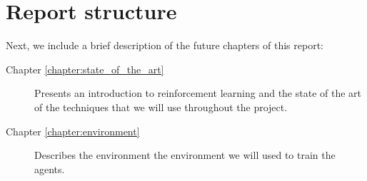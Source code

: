\section{Report structure}

Next, we include a brief description of the future chapters of this report:

\begin{description}
    \item[Chapter \ref{chapter:state_of_the_art}] Presents an introduction to reinforcement learning and the state of the art of the techniques that we will use throughout the project.
    \item[Chapter \ref{chapter:environment}] Describes the environment the environment we will used to train the agents.
\end{description}
